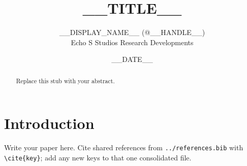 \documentclass[11pt]{article}
\title{__TITLE__}
\author{__DISPLAY_NAME__ (@__HANDLE__)\\ Echo S Studios Research Developments}
\date{__DATE__}
\begin{document}
\maketitle

\begin{abstract}
Replace this stub with your abstract.
\end{abstract}

\section{Introduction}
Write your paper here. Cite shared references from \texttt{../references.bib}
with \verb|\cite{key}|; add any new keys to that one consolidated file.
\end{document}
